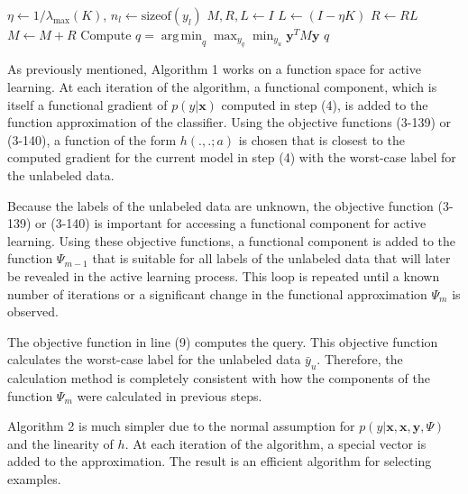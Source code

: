 \documentclass[12pt]{article}
\DeclareMathOperator*{\argmin}{arg\,min}
\begin{document}
	\begin{algorithm}[h!]
		\caption{Active Kernel L2Boost Algorithm}
		\begin{algorithmic}[1]
			 
			\State $\eta \leftarrow 1 / \lambda_{\max}(K)$, $n_l \leftarrow \text{sizeof}(y_l)$
			\State $M, R, L \leftarrow I$
			\State $L \leftarrow (I - \eta K)$
			 
			\State $R \leftarrow R L$
			\State $M \leftarrow M + R$
			\EndFor
			\State Compute $q = \argmin_{q} \max_{y_q} \min_{y_u} \mathbf{y}^T M \mathbf{y}$
			\State \Return $q$ 
			\EndProcedure
		\end{algorithmic}
	\end{algorithm}
	
	As previously mentioned, Algorithm 1 works on a function space for active learning. At each iteration of the algorithm, a functional component, which is itself a functional gradient of $p(y|\mathbf{x})$ computed in step (4), is added to the function approximation of the classifier. Using the objective functions (3-139) or (3-140), a function of the form $h(., .; a)$ is chosen that is closest to the computed gradient for the current model in step (4) with the worst-case label for the unlabeled data.
	
	Because the labels of the unlabeled data are unknown, the objective function (3-139) or (3-140) is important for accessing a functional component for active learning. Using these objective functions, a functional component is added to the function $\Psi_{m-1}$ that is suitable for all labels of the unlabeled data that will later be revealed in the active learning process. This loop is repeated until a known number of iterations or a significant change in the functional approximation $\Psi_m$ is observed.
	
	The objective function in line (9) computes the query. This objective function calculates the worst-case label for the unlabeled data $\bar{y}_u$. Therefore, the calculation method is completely consistent with how the components of the function $\Psi_m$ were calculated in previous steps.
	
	Algorithm 2 is much simpler due to the normal assumption for $p(y|\mathbf{x}, \mathbf{x}, \mathbf{y}, \Psi)$ and the linearity of $h$. At each iteration of the algorithm, a special vector is added to the approximation. The result is an efficient algorithm for selecting examples.
	
\end{document}
